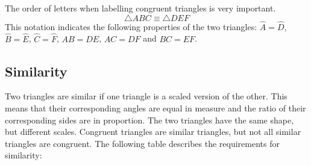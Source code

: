 The order of letters when labelling congruent triangles is very important. 
\begin{equation*}
  \triangle ABC \equiv \triangle DEF
\end{equation*}
This notation indicates the following properties of the two triangles:
$\hat{A} = \hat{D}$, $\hat{B} = \hat{E}$, $\hat{C} = \hat{F}$, $AB
= DE$, $AC = DF$ and $BC = EF$.


\subsection*{Similarity}
     
      Two triangles are similar if one triangle is a scaled version of the other. This means that their corresponding angles are equal in measure and the ratio of their corresponding sides are in proportion. The two triangles have the same shape, but different scales. Congruent triangles are similar triangles, but not all similar triangles are congruent. The following table describes the requirements for similarity:\par 
